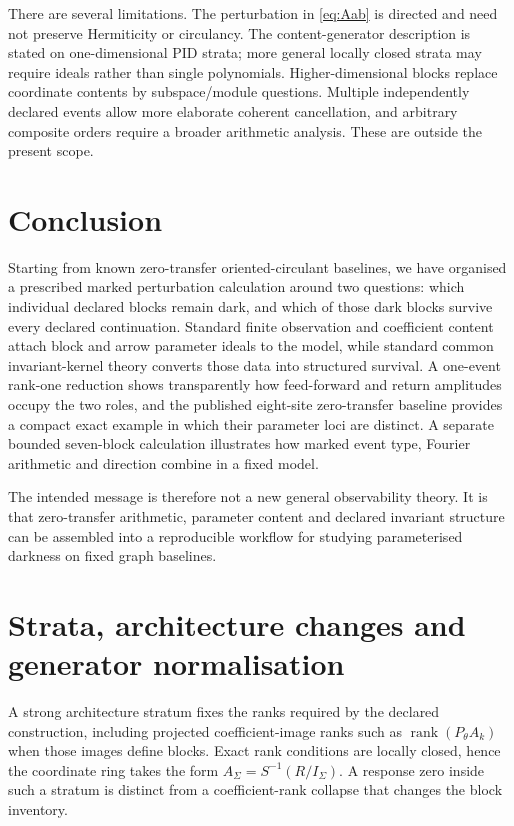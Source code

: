 \documentclass[11pt]{article}
\theoremstyle{definition}
\theoremstyle{remark}
\DeclareMathOperator{\rank}{rank}
\begin{document}
There are several limitations. The perturbation in \eqref{eq:Aab} is directed and need not preserve Hermiticity or circulancy. The content-generator description is stated on one-dimensional PID strata; more general locally closed strata may require ideals rather than single polynomials. Higher-dimensional blocks replace coordinate contents by subspace/module questions. Multiple independently declared events allow more elaborate coherent cancellation, and arbitrary composite orders require a broader arithmetic analysis. These are outside the present scope.

\section{Conclusion}

Starting from known zero-transfer oriented-circulant baselines, we have organised a prescribed marked perturbation calculation around two questions: which individual declared blocks remain dark, and which of those dark blocks survive every declared continuation. Standard finite observation and coefficient content attach block and arrow parameter ideals to the model, while standard common invariant-kernel theory converts those data into structured survival. A one-event rank-one reduction shows transparently how feed-forward and return amplitudes occupy the two roles, and the published eight-site zero-transfer baseline provides a compact exact example in which their parameter loci are distinct. A separate bounded seven-block calculation illustrates how marked event type, Fourier arithmetic and direction combine in a fixed model.

The intended message is therefore not a new general observability theory. It is that zero-transfer arithmetic, parameter content and declared invariant structure can be assembled into a reproducible workflow for studying parameterised darkness on fixed graph baselines.

\appendix

\section{Strata, architecture changes and generator normalisation}\label{app:strata}

A strong architecture stratum fixes the ranks required by the declared construction, including projected coefficient-image ranks such as $\rank(P_\theta A_k)$ when those images define blocks. Exact rank conditions are locally closed, hence the coordinate ring takes the form $A_\Sigma=S^{-1}(R/I_\Sigma)$. A response zero inside such a stratum is distinct from a coefficient-rank collapse that changes the block inventory.
\end{document}
